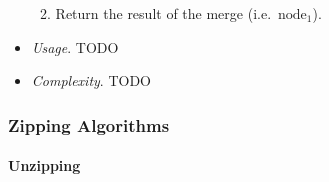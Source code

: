 \begin{itemize}
\begin{enumerate}
\begin{enumerate}
\end{enumerate}

\item Return the result of the merge (i.e.~$\mbox{node}_1$).

\end{enumerate}

\item \emph{Usage}. TODO

\item \emph{Complexity}. TODO

\end{itemize}


\subsubsection{Zipping Algorithms}

\paragraph{Unzipping}

